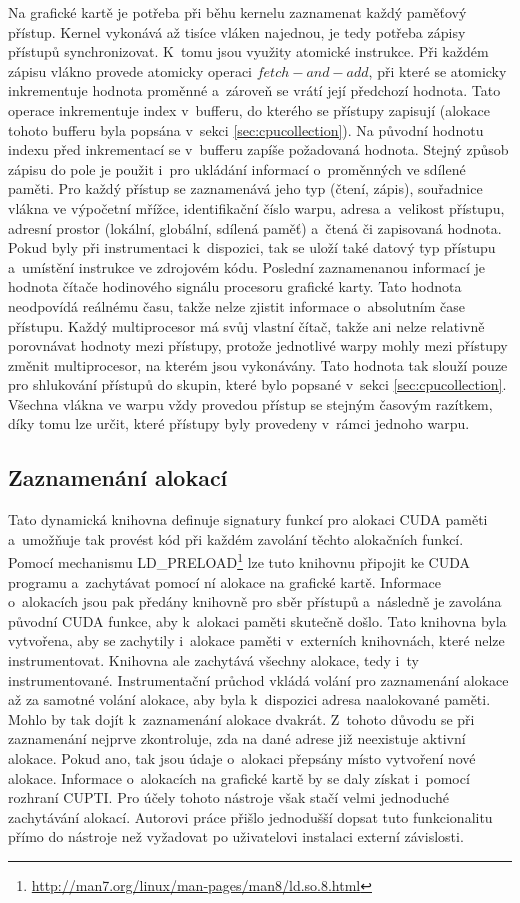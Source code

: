 Na grafické kartě je potřeba při běhu kernelu zaznamenat každý paměťový přístup. Kernel vykonává až tisíce vláken najednou, je tedy potřeba zápisy přístupů synchronizovat. K~tomu jsou využity atomické instrukce. Při každém zápisu vlákno provede atomicky operaci $fetch-and-add$, při které se atomicky inkrementuje hodnota proměnné a~zároveň se vrátí její předchozí hodnota. Tato operace inkrementuje index v~bufferu, do kterého se přístupy zapisují (alokace tohoto bufferu byla popsána v~sekci \ref{sec:cpucollection}). Na původní hodnotu indexu před inkrementací se v~bufferu zapíše požadovaná hodnota. Stejný způsob zápisu do pole je použit i~pro ukládání informací o~proměnných ve sdílené paměti. Pro každý přístup se zaznamenává jeho typ (čtení, zápis), souřadnice vlákna ve výpočetní mřížce, identifikační číslo warpu, adresa a~velikost přístupu, adresní prostor (lokální, globální, sdílená paměť) a~čtená či zapisovaná hodnota. Pokud byly při instrumentaci k~dispozici, tak se uloží také datový typ přístupu a~umístění instrukce ve zdrojovém kódu. Poslední zaznamenanou informací je hodnota čítače hodinového signálu procesoru grafické karty. Tato hodnota neodpovídá reálnému času, takže nelze zjistit informace o~absolutním čase přístupu. Každý multiprocesor má svůj vlastní čítač, takže ani nelze relativně porovnávat hodnoty mezi přístupy, protože jednotlivé warpy mohly mezi přístupy změnit multiprocesor, na kterém jsou vykonávány. Tato hodnota tak slouží pouze pro shlukování přístupů do skupin, které bylo popsané v~sekci \ref{sec:cpucollection}. Všechna vlákna ve warpu vždy provedou přístup se stejným časovým razítkem, díky tomu lze určit, které přístupy byly provedeny v~rámci jednoho warpu.

\subsection{Zaznamenání alokací}
\label{sec:runtimetracker}
Tato dynamická knihovna definuje signatury funkcí pro alokaci CUDA paměti a~umožňuje tak provést kód při každém zavolání těchto alokačních funkcí. Pomocí mechanismu LD\_PRELOAD\footnote{\url{http://man7.org/linux/man-pages/man8/ld.so.8.html}} lze tuto knihovnu připojit ke CUDA programu a~zachytávat pomocí ní alokace na grafické kartě. Informace o~alokacích jsou pak předány knihovně pro sběr přístupů a~následně je zavolána původní CUDA funkce, aby k~alokaci paměti skutečně došlo. Tato knihovna byla vytvořena, aby se zachytily i~alokace paměti v~externích knihovnách, které nelze instrumentovat. Knihovna ale zachytává všechny alokace, tedy i~ty instrumentované. Instrumentační průchod vkládá volání pro zaznamenání alokace až za samotné volání alokace, aby byla k~dispozici adresa naalokované paměti. Mohlo by tak dojít k~zaznamenání alokace dvakrát. Z~tohoto důvodu se při zaznamenání nejprve zkontroluje, zda na dané adrese již neexistuje aktivní alokace. Pokud ano, tak jsou údaje o~alokaci přepsány místo vytvoření nové alokace.
Informace o~alokacích na grafické kartě by se daly získat i~pomocí rozhraní CUPTI. Pro účely tohoto nástroje však stačí velmi jednoduché zachytávání alokací. Autorovi práce přišlo jednodušší dopsat tuto funkcionalitu přímo do nástroje než vyžadovat po uživatelovi instalaci externí závislosti.


